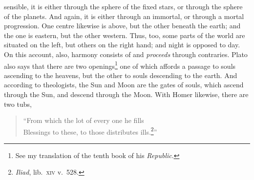 \documentclass[12pt]{article}
\begin{document}
sensible, it is either through the sphere of the fixed stars, or through the
sphere of the planets. And again, it is either through an immortal, or through
a mortal progression. One centre likewise is above, but the other beneath the
earth; and the one is eastern, but the other western. Thus, too, some parts of
the world are situated on the left, but others on the right hand; and night is
opposed to day. On this account, also, harmony consists of and
\textit{proceeds} through contraries. Plato also says that there are two
openings\footnote{See my translation of the tenth book of his
\textit{Republic}.} one of which affords a passage to souls ascending to the
heavens, but the other to souls descending to the earth. And according to
theologists, the Sun and Moon are the gates of souls, which ascend through the
Sun, and descend through the Moon. With Homer likewise, there are two tubs,

\begin{verse}
``From which the lot of every one he fills\\
Blessings to these, to those distributes ills.\footnote{\textit{Iliad}, lib.~\textsc{xiv} v.~528.}''
\end{verse}
\end{document}
